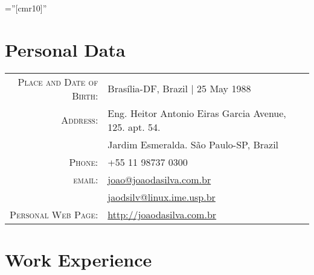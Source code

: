 \documentclass[a4paper,10pt]{article} %
\begin{document}
\pagestyle{empty} %

\font\fb=''[cmr10]'' %


\par{\bigskip\par} %

\section{Personal Data}

\begin{tabular}{rl}
\textsc{Place and Date of Birth:} & Brasília-DF, Brazil | 25 May 1988 \\
\textsc{Address:} & Eng. Heitor Antonio Eiras Garcia Avenue, 125. apt. 54.\\& Jardim Esmeralda. São Paulo-SP, Brazil \\
\textsc{Phone:} & +55 11 98737 0300\\
\textsc{email:} & \href{mailto:joao@joaodasilva.com.br}{joao@joaodasilva.com.br}\\
& \href{mailto:jaodsilv@linux.ime.usp.br}{jaodsilv@linux.ime.usp.br}\\

\textsc{Personal Web Page:} & \href{http://joaodasilva.com.br}{http://joaodasilva.com.br}\\
\end{tabular}



\section{Work Experience}
\end{document}
